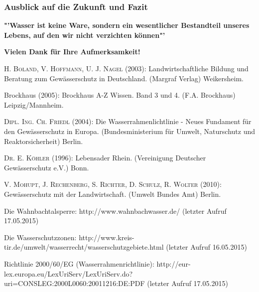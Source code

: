 \documentclass{beamer}
\begin{document}
	\begin{frame}
		\frametitle{Ausblick auf die Zukunft und Fazit}
		\LARGE
		
		\textbf{"'Wasser ist keine Ware, sondern ein wesentlicher Bestandteil unseres Lebens, auf den wir nicht verzichten können"'} \cite{wahnbachtalsperre}

		
	\end{frame}
	
	\begin{frame}
		\begin{center}
			\LARGE \textbf{Vielen Dank für Ihre Aufmerksamkeit!}
		\end{center}
	\end{frame}

	
	\begin{thebibliography}{99}
		
		
		 \textsc{H. Boland, V. Hoffmann, U. J. Nagel} (2003): Landwirtschaftliche Bildung und Beratung zum Gewässerschutz in Deutschland. (Margraf Verlag) Weikersheim.
		
		 Brockhaus (2005): Brockhaus A-Z Wissen. Band 3 und 4. (F.A. Brockhaus) Leipzig/Mannheim.
		
		 \textsc{Dipl. Ing. Ch. Friedl} (2004): Die Wasserrahmenlichtlinie - Neues Fundament für den Gewässerschutz in Europa. (Bundesministerium für Umwelt, Naturschutz und Reaktorsicherheit) Berlin.
		
		 \textsc{Dr. E. Köhler} (1996): Lebensader Rhein. (Vereinigung Deutscher Gewässerschutz e.V.) Bonn.
		
		 \textsc{V. Mohupt, J. Rechenberg, S. Richter, D. Schulz, R. Wolter} (2010): Gewässerschutz mit der Landwirtschaft. (Umwelt Bundes Amt) Berlin.
	
		
		 Die Wahnbachtalsperre: http://www.wahnbachwasser.de/ (letzter Aufruf 17.05.2015)
		
		 Die Wasserschutzzonen: http://www.kreis-tir.de/umwelt/wasserrecht/wasserschutzgebiete.html (letzter Aufruf 16.05.2015)
		
		 Richtlinie 2000/60/EG (Wasserrahmenrichtlinie): http://eur-lex.europa.eu/LexUriServ/LexUriServ.do?uri=CONSLEG:2000L0060:20011216:DE:PDF (letzter Aufruf 17.05.2015)
		

\end{thebibliography}
\end{document}
